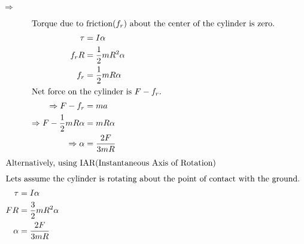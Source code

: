 \documentclass{article}
\begin{document}
$\Rightarrow$
\begin{center}
\end{center}
\begin{align*}
	\intertext{Torque due to friction($f_r$) about the center of the cylinder is zero.}
	\tau &= I\alpha\\
	f_rR &= \dfrac{1}{2}mR^2\alpha\\
	f_r &= \dfrac{1}{2}mR\alpha\\
	\intertext{Net force on the cylinder is $F-f_r$.}
	\Rightarrow F-f_r &= ma\\
	\Rightarrow F-\dfrac{1}{2}mR\alpha &= mR\alpha\\
	\Rightarrow \alpha &= \dfrac{2F}{3mR}
\end{align*}
\begin{align*}
	\intertext{Alternatively, using IAR(Instantaneous Axis of Rotation)}
	\intertext{Lets assume the cylinder is rotating about the point of contact with the ground.}
	\tau &= I\alpha\\
	FR &= \dfrac{3}{2}mR^2\alpha\\
	\alpha &= \dfrac{2F}{3mR}
\end{align*}
\pagebreak

\vspace*{\fill}
\begin{center}
	\fbox{\qrcode[height=2cm]{\gdrive}}
\end{center}
\vspace*{\fill}
\end{document}
